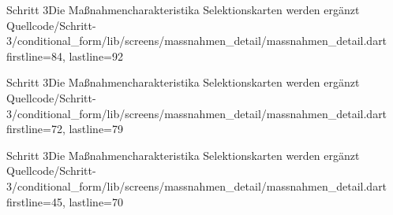\begin{alexlisting}{Schritt 3}{Die Maßnahmencharakteristika Selektionskarten werden ergänzt}
    {Quellcode/Schritt-3/conditional_form/lib/screens/massnahmen_detail/massnahmen_detail.dart}
    {firstline=84, lastline=92}
    \label{lst:Schritt3DieMassnahmencharakteristikaSelektionskartenWerdenergaenzt}
\end{alexlisting}


\begin{alexlisting}{Schritt 3}{Die Maßnahmencharakteristika Selektionskarten werden ergänzt}
    {Quellcode/Schritt-3/conditional_form/lib/screens/massnahmen_detail/massnahmen_detail.dart}
    {firstline=72, lastline=79}
    \label{lst:Schritt3DieMassnahmencharakteristikaSelektionskartenWerdenergaenzt}
\end{alexlisting}

\begin{alexlisting}{Schritt 3}{Die Maßnahmencharakteristika Selektionskarten werden ergänzt}
    {Quellcode/Schritt-3/conditional_form/lib/screens/massnahmen_detail/massnahmen_detail.dart}
    {firstline=45, lastline=70}
    \label{lst:Schritt3DieMassnahmencharakteristikaSelektionskartenWerdenergaenzt}
\end{alexlisting}




\clearpage 
